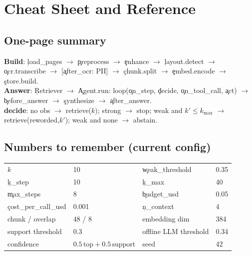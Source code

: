 \chapter{Cheat Sheet and Reference}
\section{One-page summary}
\begin{keyidea}
\textbf{Build}: \c{load\_pages} $\to$ \c{preprocess} $\to$ \c{enhance} $\to$ \c{layout.detect} $\to$ \c{ocr.transcribe} $\to$ [\c{after\_ocr}: PII] $\to$ \c{chunk.split} $\to$ \c{embed.encode} $\to$ \c{store.build}.\\
\textbf{Answer}: \c{Retriever} $\to$ \c{Agent.run}: loop(\c{on\_step}, \c{decide}, \c{on\_tool\_call}, \c{act}) $\to$ \c{before\_answer} $\to$ \c{synthesize} $\to$ \c{after\_answer}.\\
\textbf{decide}: no obs $\to$ retrieve($k$); strong $\to$ stop; weak and $k'\le k_{\max}$ $\to$ retrieve(reworded,$k'$); weak and none $\to$ abstain.
\end{keyidea}

\section{Numbers to remember (current config)}
\begin{center}\begin{tabular}{@{}ll@{\qquad}ll@{}}\toprule
$k$ & 10 & \c{weak\_threshold} & 0.35 \\
\c{k\_step} & 10 & \c{k\_max} & 40 \\
\c{max\_steps} & 8 & \c{budget\_usd} & 0.05 \\
\c{cost\_per\_call\_usd} & 0.001 & \c{n\_context} & 4 \\
chunk / overlap & 48 / 8 & embedding dim & 384 \\
support threshold & 0.3 & offline LLM threshold & 0.34 \\
confidence & $0.5\,\text{top}+0.5\,\text{support}$ & seed & 42 \\
\bottomrule\end{tabular}\end{center}


